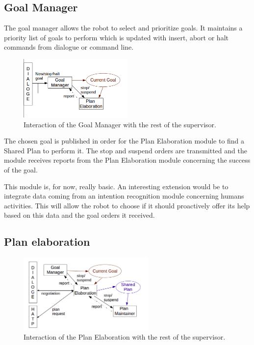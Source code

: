 \documentclass[english,a4paper,11pt,twoside]{StyleThese}
\begin{document}
\subsection{Goal Manager}

The goal manager allows the robot to select and prioritize goals. It maintains a priority list of goals to perform which is updated with insert, abort or halt commands from dialogue or command line. 

\begin{figure}[!h]
	\centering
    \includegraphics[width=0.5\textwidth]{figs/Chapter2/GoalManager.png}
    \caption{Interaction of the Goal Manager with the rest of the supervisor.}
    \label{fig:goalManager}
\end{figure}

The chosen goal is published in order for the Plan Elaboration module to find a Shared Plan to perform it. The stop and suspend orders are transmitted and the module receives reports from the Plan Elaboration module concerning the success of the goal.

This module is, for now, really basic. An interesting extension would be to integrate data coming from an intention recognition module concerning humans activities. This will allow the robot to choose if it should proactively offer its help based on this data and the goal orders it received. 

\subsection{Plan elaboration}

\begin{figure}[!h]
	\centering
    \includegraphics[width=0.6\textwidth]{figs/Chapter2/PlanElaboration.png}
    \caption{Interaction of the Plan Elaboration with the rest of the supervisor.}
    \label{fig:planElaboration}
\end{figure}
\end{document}
